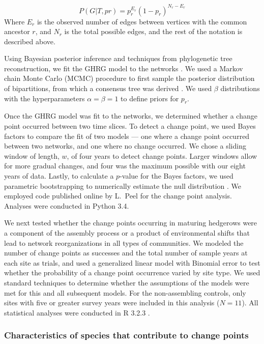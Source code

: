 \documentclass[12pt]{article}
\begin{document}
\begin{equation}
  \label{eq:lik}
  P(G|T,{pr}) = p_r^{E_r}(1-p_r)^{N_r-E_r}
\end{equation}
% 
Where $E_r$ is the observed number of edges between vertices with the
common ancestor $r$, and $N_r$ is the total possible edges, and the
rest of the notation is described above.

Using Bayesian posterior inference and techniques from phylogenetic
tree reconstruction, we fit the GHRG model to the networks
\citep{peel2014detecting}. We used a Markov chain Monte Carlo (MCMC)
procedure to first sample the posterior distribution of bipartitions,
from which a consensus tree was derived \citep{peel2014detecting}. We
used $\beta$ distributions with the hyperparameters $\alpha=\beta=1$
to define priors for $p_r$.

Once the GHRG model was fit to the networks, we determined whether a
change point occurred between two time slices. To detect a change
point, we used Bayes factors to compare the fit of two models --- one
where a change point occurred between two networks, and one where no
change occurred. We chose a sliding window of length, $w$, of four
years to detect change points. Larger windows allow for more gradual
changes, and four was the maximum possible with our eight years of
data. Lastly, to calculate a $p$-value for the Bayes factors, we used
parametric bootstrapping to numerically estimate the null distribution
\citep{peel2014detecting}. We employed code published online by
L.~Peel for the change point analysis. Analyses were conducted in
Python 3.4.

We next tested whether the change points occurring in maturing
hedgerows were a component of the assembly process or a product of
environmental shifts that lead to network reorganizations in all types
of communities. We modeled the number of change points as successes
and the total number of sample years at each site as trials, and used
a generalized linear model with Binomial error to test whether the
probability of a change point occurrence varied by site type. We used
standard techniques to determine whether the assumptions of the models
were met for this and all subsequent models. For the non-assembling
controls, only sites with five or greater survey years were included
in this analysis ($N=11$). All statistical analyses were conducted in
R 3.2.3 \citep{R}.

\subsubsection*{Characteristics of species that contribute to change
  points}
\end{document}
